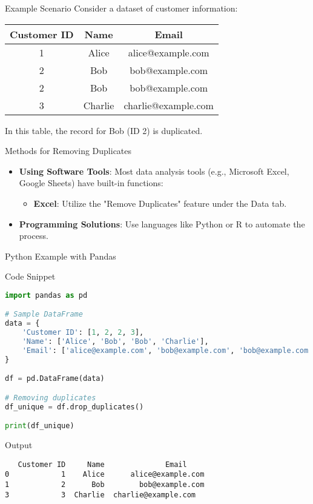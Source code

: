 \documentclass[aspectratio=169]{beamer}
\begin{document}
\begin{frame}{Example Scenario}
  Consider a dataset of customer information:
  
  \begin{table}[]
    \centering
    \begin{tabular}{|c|c|c|}
    \hline
    Customer ID & Name    & Email                \\ \hline
    1           & Alice   & alice@example.com     \\ \hline
    2           & Bob     & bob@example.com       \\ \hline
    2           & Bob     & bob@example.com       \\ \hline
    3           & Charlie & charlie@example.com   \\ \hline
    \end{tabular}
  \end{table}
  
  In this table, the record for Bob (ID 2) is duplicated.
\end{frame}

\begin{frame}[fragile]{Methods for Removing Duplicates}
  \begin{itemize}
    \item \textbf{Using Software Tools}: Most data analysis tools (e.g., Microsoft Excel, Google Sheets) have built-in functions:
      \begin{itemize}
        \item \textbf{Excel}: Utilize the "Remove Duplicates" feature under the Data tab.
      \end{itemize}
    \item \textbf{Programming Solutions}: Use languages like Python or R to automate the process.
  \end{itemize}
\end{frame}

\begin{frame}[fragile]{Python Example with Pandas}
  \begin{block}{Code Snippet}
    \begin{lstlisting}[language=Python]
import pandas as pd

# Sample DataFrame
data = {
    'Customer ID': [1, 2, 2, 3],
    'Name': ['Alice', 'Bob', 'Bob', 'Charlie'],
    'Email': ['alice@example.com', 'bob@example.com', 'bob@example.com', 'charlie@example.com']
}

df = pd.DataFrame(data)

# Removing duplicates
df_unique = df.drop_duplicates()

print(df_unique)
    \end{lstlisting}
  \end{block}
  \begin{block}{Output}
    \begin{lstlisting}
   Customer ID     Name              Email
0            1    Alice      alice@example.com
1            2      Bob        bob@example.com
3            3  Charlie  charlie@example.com
    \end{lstlisting}
  \end{block}
\end{frame}
\end{document}
